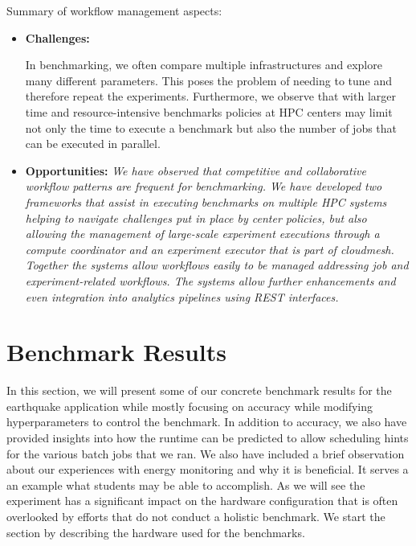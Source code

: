 \begin{tcolorbox}
Summary of workflow management aspects:

\begin{itemize}

\item {\bf Challenges:} {\it 

In benchmarking, we often compare multiple infrastructures and explore many different parameters. This poses the problem of needing to tune and therefore repeat the experiments. Furthermore, we observe that with larger time and resource-intensive benchmarks policies at HPC centers may limit not only the time to execute a benchmark but also the number of jobs that can be executed in parallel.
}


\item {\bf Opportunities:} {\it We have observed that competitive and collaborative workflow patterns are frequent for benchmarking. We have developed two frameworks that assist in executing benchmarks on multiple HPC systems helping to navigate challenges put in place by center policies, but also allowing the management of large-scale experiment executions through a compute coordinator and an experiment executor that is part of cloudmesh. Together the systems allow workflows easily to be managed addressing job and experiment-related workflows. The systems allow further enhancements and even integration into analytics pipelines using REST interfaces.}

\end{itemize}
\end{tcolorbox}
  


\section{Benchmark Results}
\label{sec:results}

In this section, we will present some of our concrete benchmark results for the earthquake application while mostly focusing on accuracy while modifying hyperparameters to control the benchmark. In addition to accuracy, we also have provided insights into how the runtime can be predicted to allow scheduling hints for the various batch jobs that we ran. We also have included a brief observation about our experiences with energy monitoring and why it is beneficial. 
It serves a an example what students may be able to accomplish. As we will see the experiment has a significant impact on the hardware configuration that is often overlooked by efforts that do not conduct a holistic benchmark.
We start the section by describing the hardware used for the benchmarks.



